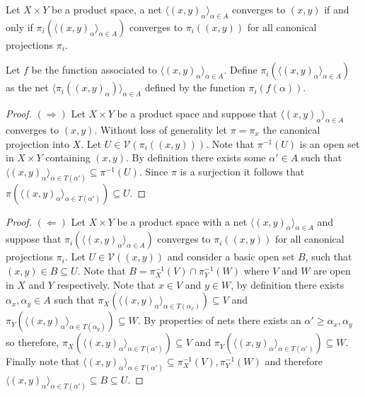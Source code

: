 \documentclass[minion]{homework651}
\begin{document}
\begin{problems}
Let $X \times Y$ be a product space, a net $\langle (x, y)_\alpha \rangle_{\alpha \in A}$
converges to $(x, y)$ if and only if $\pi_i(\langle (x, y)_\alpha \rangle_{\alpha \in A})$ converges to $\pi_i((x, y))$ for all
canonical projections $\pi_i$. 

Let $f$ be the function associated to $\langle (x, y)_\alpha \rangle_{\alpha \in A}$. Define $\pi_i(\langle (x, y)_\alpha \rangle_{\alpha \in A})$ 
as the net $\langle \pi_i((x, y)_\alpha) \rangle_{\alpha \in A}$ defined by the function $\pi_i(f(\alpha))$. 

\begin{proof} $(\Rightarrow)$ Let $X \times Y$ be a product space and suppose that  $\langle (x, y)_\alpha \rangle_{\alpha \in A}$
    converges to $(x, y)$. Without loss of generality let $\pi = \pi_x$ the canonical projection into $X$. 
    Let $U \in \mathcal{V}(\pi_i((x, y)))$. Note that $\pi^{-1}(U)$ is an open set in $X \times Y$ containing $(x, y)$. By 
    definition there exists some $\alpha' \in A$ such that $\langle (x, y)_\alpha \rangle_{\alpha \in T(\alpha')} \subseteq  \pi^{-1}(U)$. 
    Since $\pi$ is a surjection it follows that $\pi(\langle (x, y)_\alpha \rangle_{\alpha \in T(\alpha')}) \subseteq  U$.
\end{proof}


\begin{proof} $(\Leftarrow)$ Let $X \times Y$ be a product space with a net $\langle (x, y)_\alpha \rangle_{\alpha \in A}$ and suppose that $\pi_i(\langle (x, y)_\alpha \rangle_{\alpha \in A})$ converges to $\pi_i((x, y))$ for all
    canonical projections $\pi_i$. Let $U \in \mathcal{V}((x, y))$ and consider a basic open set $B$, such that $(x, y) \in B \subseteq U$.
    Note that $B = \pi_X^{-1}(V) \cap \pi_Y^{-1}(W)$ where $V$ and $W$ are open in $X$ and $Y$ respectively. Note that 
    $x \in V$ and $y \in W$, by definition there exists $\alpha_x, \alpha_y \in A$ such that $\pi_X(\langle (x, y)_\alpha \rangle_{\alpha \in T(\alpha_x)}) \subseteq V$
    and $\pi_Y(\langle (x, y)_\alpha \rangle_{\alpha \in T(\alpha_y)}) \subseteq W$. By properties of nets there exists an $\alpha' \geq \alpha_x, \alpha_y$ so therefore, 
    $\pi_X(\langle (x, y)_\alpha \rangle_{\alpha \in T(\alpha')}) \subseteq V$ and $\pi_Y(\langle (x, y)_\alpha \rangle_{\alpha \in T(\alpha')}) \subseteq W$. Finally note
    that $\langle (x, y)_\alpha \rangle_{\alpha \in T(\alpha')} \subseteq \pi_X^{-1}(V), \pi_Y^{-1}(W)$ and therefore 
    $\langle (x, y)_\alpha \rangle_{\alpha \in T(\alpha')} \subseteq B \subseteq U$.
\end{proof}




\end{problems}
\end{document}

